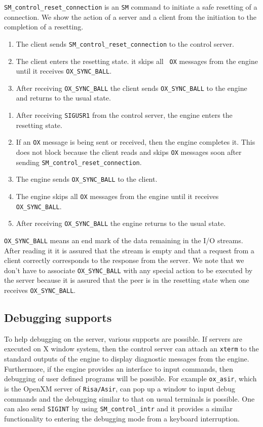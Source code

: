 {\tt SM\_control\_reset\_connection} is an {\tt SM} command to
initiate a safe resetting of a connection. We show the action of 
a server and a client from the initiation to the completion of
a resetting.

\centerline{}

\begin{enumerate}
\item The client sends {\tt SM\_control\_reset\_connection} to the
control server.
\item The client enters the resetting state. it skips all {\tt
OX} messages from the engine until it receives {\tt OX\_SYNC\_BALL}.
\item After receiving {\tt OX\_SYNC\_BALL} the client sends 
{\tt OX\_SYNC\_BALL} to the engine and returns to the usual state.
\end{enumerate}

\centerline{}

\begin{enumerate}
\item After receiving {\tt SIGUSR1} from the control server,
the engine enters the resetting state.
\item If an {\tt OX} message is being sent or received, then
the engine completes it. This does not block because
the client reads and skips {\tt OX} messages soon after sending
{\tt SM\_control\_reset\_connection}.
\item The engine sends {\tt OX\_SYNC\_BALL} to the client.
\item The engine skips all {\tt OX} messages from the engine until it
receives {\tt OX\_SYNC\_BALL}.
\item After receiving {\tt OX\_SYNC\_BALL} the engine returns to the
usual state.
\end{enumerate}

{\tt OX\_SYNC\_BALL} means an end mark of the data remaining in the
I/O streams. After reading it it is assured that the stream is empty
and that a request from a client correctly corresponds to the response
from the server. We note that we don't have to associate 
{\tt OX\_SYNC\_BALL} with
any special action to be executed by the server because it is
assured that the peer is in the resetting state when one receives
{\tt OX\_SYNC\_BALL}.

\subsection{Debugging supports}
To help debugging on the server, various supports are possible. If
servers are executed on X window system, then the control server can
attach an {\tt xterm} to the standard outputs of the engine to display
diagnostic messages from the engine.
Furthermore, if the engine provides an interface to input commands,
then debugging of user defined programs will be
possible. For example {\tt ox\_asir}, which is
the OpenXM server of {\tt Risa/Asir}, can pop up a window to input
debug commands and the debugging similar to that on usual terminals is possible.
One can also send {\tt SIGINT} by using {\tt SM\_control\_intr}
and it provides a similar functionality to entering the debugging
mode from a keyboard interruption.

